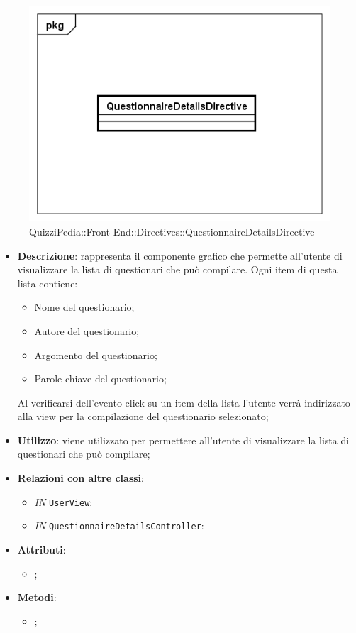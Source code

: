 \begin{figure}[h]
	\centering
	\includegraphics[scale=0.5,keepaspectratio]{UML/Classi/Front-End/QuizziPedia_Front-end_Directives_QuestionnaireDetailsDirective.png}
	\caption{QuizziPedia::Front-End::Directives::QuestionnaireDetailsDirective}
\end{figure}

\begin{itemize}
	\item \textbf{Descrizione}: rappresenta il componente grafico che permette all'utente di visualizzare la lista di questionari che può compilare. Ogni item di questa lista contiene:
		\begin{itemize}
			\item Nome del questionario;
			\item Autore del questionario;
			\item Argomento del questionario;
			\item Parole chiave del questionario;
		\end{itemize}
	Al verificarsi dell'evento click su un item della lista l'utente verrà indirizzato alla view per la compilazione del questionario selezionato;
	\item \textbf{Utilizzo}: viene utilizzato per permettere all'utente di visualizzare la lista di questionari che può compilare;
	\item \textbf{Relazioni con altre classi}: 
	\begin{itemize}
		\item \textit{IN} \texttt{UserView}: 
		\item \textit{IN} \texttt{QuestionnaireDetailsController}: 
	\end{itemize}
	\item \textbf{Attributi}: 
	\begin{itemize}
		\item ;
	\end{itemize}
	\item \textbf{Metodi}: 
	\begin{itemize}
		\item ;
	\end{itemize}
\end{itemize}

